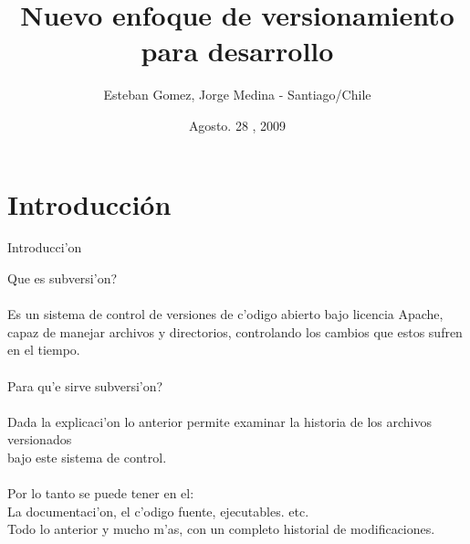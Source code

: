 \documentclass[xcolor=dvipsnames]{beamer}
\title[Control de Versiones]{Nuevo enfoque de versionamiento para desarrollo}
\author{Esteban Gomez, Jorge Medina - Santiago/Chile}
\institute{ADEM Ltda. - Grupo Empresas JP \scriptsize{\textcircled{\tiny{R}}}}
\date{Agosto. 28 , 2009}
\begin{document}
\fontsize{7}{9}
	\begin{frame}
		\titlepage
	\end{frame}
	
\section{Introducci\'on}
	\begin{frame}{Introducci'on}
	\scriptsize
	{
	\begin{tabbing}	
	Que es subversi'on? \\ \\
	Es un sistema de control de versiones de c'odigo abierto bajo licencia Apache,		\\
	capaz de manejar archivos y directorios, controlando los cambios que estos sufren 	\\
	en el tiempo. \\ \\
	Para qu'e sirve subversi'on?\\ \\
	Dada la explicaci'on lo anterior permite examinar la historia de los archivos versionados\\
	bajo este sistema de control.\\ \\
	
	Por lo tanto se puede tener en el:\\ 
	La documentaci'on, el c'odigo fuente, ejecutables. etc. \\
	Todo lo anterior y mucho m'as, con un completo historial de modificaciones.\\
	\end{tabbing}
	}
	\end{frame}
	
\end{document}
